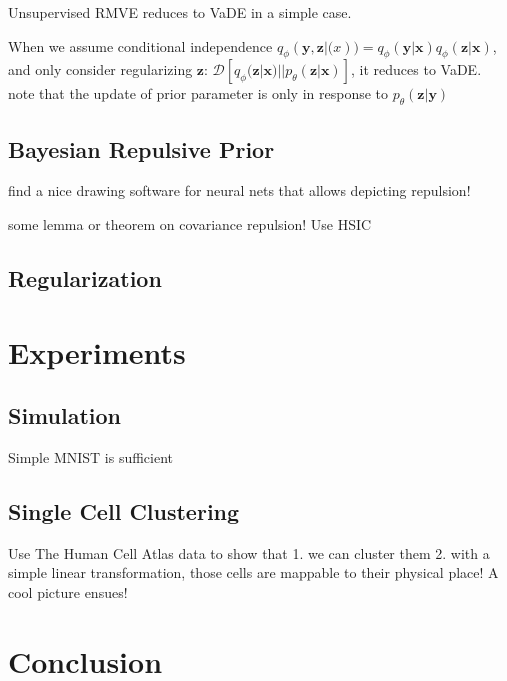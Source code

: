 \documentclass[twoside,11pt]{article}
\begin{document}
\begin{remark}
Unsupervised RMVE reduces to VaDE in a simple case.
\end{remark}

When we assume conditional independence $q_\phi(\bm{y}, \bm{z} | \bm(x)) = q_\phi(\bm{y} | 
\bm{x}) q_\phi(\bm{z} | \bm{x})$, and only consider regularizing $\bm{z}$: 
$\mathcal{D} \left[ q_\phi (\bm{z} | \bm{x}) || 
p_\theta (\bm{z} | \bm{x}) \right]$, it reduces to VaDE. \\

\noindent note that the update of prior parameter is only in response to $p_\theta(\bm{z} | \bm{y})$ \\


\subsection{Bayesian Repulsive Prior}

find a nice drawing software for neural nets that allows depicting repulsion!

\begin{lemma}
some lemma or theorem on covariance repulsion! Use HSIC
\end{lemma}

\subsection{Regularization}

\section{Experiments}



\subsection{Simulation}
\label{subsec:sim}

Simple MNIST is sufficient

\subsection{Single Cell Clustering}
\label{subsec:tcga}

Use The Human Cell Atlas data to show that 1. we can cluster them 2. with a simple linear transformation, those cells are mappable to their physical place! A cool picture ensues!
\cite{weinstein2013cancer}

\section{Conclusion}
\label{sec:conclusion}


\newpage

\appendix


\vskip 0.2in

\end{document}
